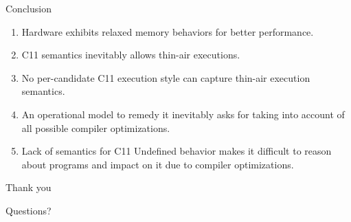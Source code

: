 \documentclass{beamer}
\begin{document}
    \begin{frame}{Conclusion}
        \begin{enumerate}
            \item Hardware exhibits relaxed memory behaviors for better performance. 
            \item C11 semantics inevitably allows thin-air executions.
            \item No per-candidate C11 execution style can capture thin-air execution semantics. 
            \item An operational model to remedy it inevitably asks for taking into account of all possible compiler optimizations. 
            \item Lack of semantics for C11 Undefined behavior makes it difficult to reason about programs and impact on it due to compiler optimizations. 
        \end{enumerate}
    \end{frame}

    \begin{frame}{Thank you}

        Questions?
        
    \end{frame}
\end{document}
